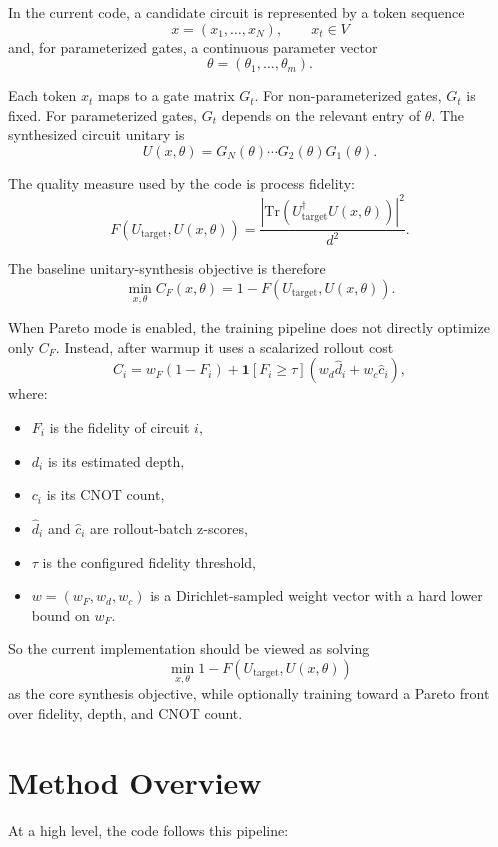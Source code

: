\documentclass[11pt]{article}
\begin{document}
In the current code, a candidate circuit is represented by a token sequence
\[
x = (x_1, \ldots, x_N), \qquad x_t \in V
\]
and, for parameterized gates, a continuous parameter vector
\[
\theta = (\theta_1, \ldots, \theta_m).
\]

Each token $x_t$ maps to a gate matrix $G_t$. For non-parameterized gates, $G_t$ is fixed. For parameterized gates, $G_t$ depends on the relevant entry of $\theta$. The synthesized circuit unitary is
\[
U(x,\theta) = G_N(\theta)\cdots G_2(\theta)G_1(\theta).
\]

The quality measure used by the code is process fidelity:
\[
F(U_{\mathrm{target}}, U(x,\theta)) =
\frac{\left|\mathrm{Tr}\left(U_{\mathrm{target}}^\dagger U(x,\theta)\right)\right|^2}{d^2}.
\]

The baseline unitary-synthesis objective is therefore
\[
\min_{x,\theta} C_F(x,\theta)
=
1 - F(U_{\mathrm{target}}, U(x,\theta)).
\]

When Pareto mode is enabled, the training pipeline does not directly optimize only $C_F$. Instead, after warmup it uses a scalarized rollout cost
\[
C_i =
w_F (1 - F_i)
    + \mathbf{1}[F_i \ge \tau]
      \left(
        w_d \hat d_i + w_c \hat c_i
      \right),
\]
where:

\begin{itemize}[leftmargin=*]
\item $F_i$ is the fidelity of circuit $i$,
\item $d_i$ is its estimated depth,
\item $c_i$ is its CNOT count,
\item $\hat d_i$ and $\hat c_i$ are rollout-batch z-scores,
\item $\tau$ is the configured fidelity threshold,
\item $w = (w_F, w_d, w_c)$ is a Dirichlet-sampled weight vector with a hard lower bound on $w_F$.
\end{itemize}

So the current implementation should be viewed as solving
\[
\min_{x,\theta} 1 - F(U_{\mathrm{target}}, U(x,\theta))
\]
as the core synthesis objective, while optionally training toward a Pareto front over fidelity, depth, and CNOT count.

\section{Method Overview}

At a high level, the code follows this pipeline:
\end{document}
